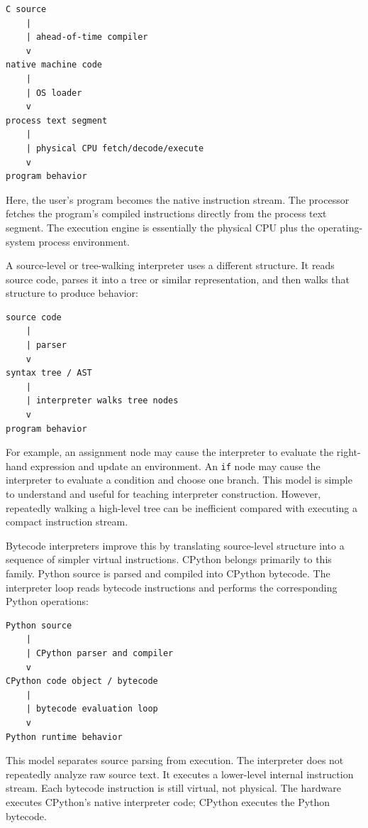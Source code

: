 \begin{verbatim}
C source
    |
    | ahead-of-time compiler
    v
native machine code
    |
    | OS loader
    v
process text segment
    |
    | physical CPU fetch/decode/execute
    v
program behavior
\end{verbatim}

Here, the user's program becomes the native instruction stream. The processor fetches the program's compiled instructions directly from the process text segment. The execution engine is essentially the physical CPU plus the operating-system process environment.

A source-level or tree-walking interpreter uses a different structure. It reads source code, parses it into a tree or similar representation, and then walks that structure to produce behavior:

\begin{verbatim}
source code
    |
    | parser
    v
syntax tree / AST
    |
    | interpreter walks tree nodes
    v
program behavior
\end{verbatim}

For example, an assignment node may cause the interpreter to evaluate the right-hand expression and update an environment. An \texttt{if} node may cause the interpreter to evaluate a condition and choose one branch. This model is simple to understand and useful for teaching interpreter construction. However, repeatedly walking a high-level tree can be inefficient compared with executing a compact instruction stream.

Bytecode interpreters improve this by translating source-level structure into a sequence of simpler virtual instructions. CPython belongs primarily to this family. Python source is parsed and compiled into CPython bytecode. The interpreter loop reads bytecode instructions and performs the corresponding Python operations:

\begin{verbatim}
Python source
    |
    | CPython parser and compiler
    v
CPython code object / bytecode
    |
    | bytecode evaluation loop
    v
Python runtime behavior
\end{verbatim}

This model separates source parsing from execution. The interpreter does not repeatedly analyze raw source text. It executes a lower-level internal instruction stream. Each bytecode instruction is still virtual, not physical. The hardware executes CPython's native interpreter code; CPython executes the Python bytecode.

